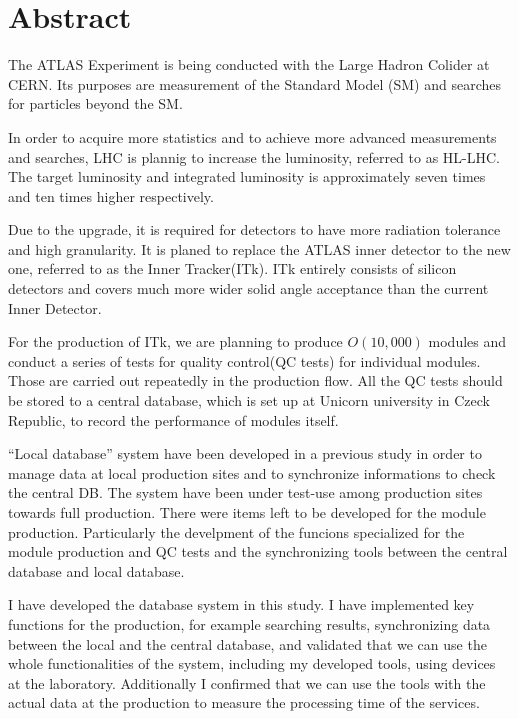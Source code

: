 \chapter*{Abstract}

The ATLAS Experiment is being conducted with the Large Hadron Colider at CERN. Its purposes are measurement of the Standard Model (SM) and searches for particles beyond the SM.

In order to acquire more statistics and to achieve more advanced measurements and searches, LHC is plannig to increase the luminosity, referred to as HL-LHC.
The target luminosity and integrated luminosity is approximately seven times and ten times higher respectively.

Due to the upgrade, it is required for detectors to have more radiation tolerance and high granularity. 
It is planed to replace the ATLAS inner detector to the new one, referred to as the Inner Tracker(ITk). 
ITk entirely consists of silicon detectors and covers much more wider solid angle acceptance than the current Inner Detector.

For the production of ITk, we are planning to produce $O(10,000)$ modules and conduct a series of tests for quality control(QC tests) for individual modules. 
Those are carried out repeatedly in the production flow.
All the QC tests should be stored to a central database, which is set up at Unicorn university in Czeck Republic, to record the performance of modules itself. 

``Local database'' system have been developed in a previous study in order to manage data at local production sites and to synchronize informations to check the central DB. The system have been under test-use among production sites towards full production.
There were items left to be developed for the module production. Particularly the develpment of the funcions specialized for the module production and QC tests and the synchronizing tools between the central database and local database.

I have developed the database system in this study.
I have implemented key functions for the production, for example searching results, synchronizing data between the local and the central database, and validated that we can use the whole functionalities of the system, including my developed tools, using devices at the laboratory. 
Additionally I confirmed that we can use the tools with the actual data at the production to measure the processing time of the services.

